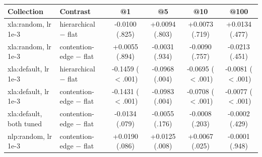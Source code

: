 \begin{tabular}{llcccc}
\toprule
Collection & Contrast & @1 & @5 & @10 & @100 \\
\midrule
xla:random, lr 1e-3 & hierarchical $-$ flat & -0.0100 (.825) & +0.0094 (.803) & +0.0073 (.719) & +0.0134 (.477) \\
xla:random, lr 1e-3 & contention-edge $-$ flat & +0.0055 (.894) & -0.0031 (.934) & -0.0090 (.757) & -0.0213 (.451) \\
xla:default, lr 1e-3 & hierarchical $-$ flat & -0.1459 ($<$.001) & -0.0968 (.004) & -0.0695 ($<$.001) & -0.0081 ($<$.001) \\
xla:default, lr 1e-3 & contention-edge $-$ flat & -0.1431 ($<$.001) & -0.0983 (.004) & -0.0708 ($<$.001) & -0.0077 ($<$.001) \\
xla:default, both tuned & contention-edge $-$ flat & -0.0134 (.079) & -0.0055 (.176) & -0.0008 (.203) & -0.0002 (.429) \\
nlp:random, lr 1e-3 & contention-edge $-$ flat & +0.0190 (.086) & +0.0125 (.008) & +0.0067 (.025) & -0.0001 (.948) \\
\bottomrule
\end{tabular}
